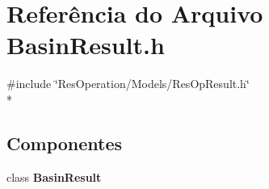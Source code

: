 \section{Referência do Arquivo Basin\+Result.\+h}
\label{_models_2_basin_2_basin_result_8h}
{\ttfamily \#include \char`\"{}Res\+Operation/\+Models/\+Res\+Op\+Result.\+h\char`\"{}}\\*
\subsection*{Componentes}
\begin{DoxyCompactItemize}
\item 
class {\bf Basin\+Result}
\end{DoxyCompactItemize}
